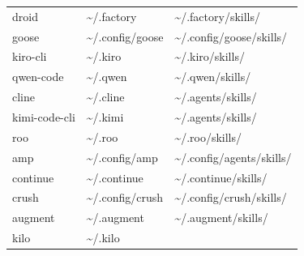 \documentclass[
  american,
  10pt,
]{report}
\renewcommand{\texttt}[1]{{\ttfamily\hyphenchar\font=-1 #1}}
\begin{document}
{\begin{longtable}[]{@{}lll@{}}
\texttt{droid} &
\texttt{\textasciitilde{}/\allowbreak{}.\allowbreak{}factory} &
\texttt{\textasciitilde{}/\allowbreak{}.\allowbreak{}factory/\allowbreak{}skills/\allowbreak{}} \\
\texttt{goose} &
\texttt{\textasciitilde{}/\allowbreak{}.\allowbreak{}config/\allowbreak{}goose}
&
\texttt{\textasciitilde{}/\allowbreak{}.\allowbreak{}config/\allowbreak{}goose/\allowbreak{}skills/\allowbreak{}} \\
\texttt{kiro-\allowbreak{}cli} &
\texttt{\textasciitilde{}/\allowbreak{}.\allowbreak{}kiro} &
\texttt{\textasciitilde{}/\allowbreak{}.\allowbreak{}kiro/\allowbreak{}skills/\allowbreak{}} \\
\texttt{qwen-\allowbreak{}code} &
\texttt{\textasciitilde{}/\allowbreak{}.\allowbreak{}qwen} &
\texttt{\textasciitilde{}/\allowbreak{}.\allowbreak{}qwen/\allowbreak{}skills/\allowbreak{}} \\
\texttt{cline} &
\texttt{\textasciitilde{}/\allowbreak{}.\allowbreak{}cline} &
\texttt{\textasciitilde{}/\allowbreak{}.\allowbreak{}agents/\allowbreak{}skills/\allowbreak{}} \\
\texttt{kimi-\allowbreak{}code-\allowbreak{}cli} &
\texttt{\textasciitilde{}/\allowbreak{}.\allowbreak{}kimi} &
\texttt{\textasciitilde{}/\allowbreak{}.\allowbreak{}agents/\allowbreak{}skills/\allowbreak{}} \\
\texttt{roo} & \texttt{\textasciitilde{}/\allowbreak{}.\allowbreak{}roo}
&
\texttt{\textasciitilde{}/\allowbreak{}.\allowbreak{}roo/\allowbreak{}skills/\allowbreak{}} \\
\texttt{amp} &
\texttt{\textasciitilde{}/\allowbreak{}.\allowbreak{}config/\allowbreak{}amp}
&
\texttt{\textasciitilde{}/\allowbreak{}.\allowbreak{}config/\allowbreak{}agents/\allowbreak{}skills/\allowbreak{}} \\
\texttt{continue} &
\texttt{\textasciitilde{}/\allowbreak{}.\allowbreak{}continue} &
\texttt{\textasciitilde{}/\allowbreak{}.\allowbreak{}continue/\allowbreak{}skills/\allowbreak{}} \\
\texttt{crush} &
\texttt{\textasciitilde{}/\allowbreak{}.\allowbreak{}config/\allowbreak{}crush}
&
\texttt{\textasciitilde{}/\allowbreak{}.\allowbreak{}config/\allowbreak{}crush/\allowbreak{}skills/\allowbreak{}} \\
\texttt{augment} &
\texttt{\textasciitilde{}/\allowbreak{}.\allowbreak{}augment} &
\texttt{\textasciitilde{}/\allowbreak{}.\allowbreak{}augment/\allowbreak{}skills/\allowbreak{}} \\
\texttt{kilo} &
\texttt{\textasciitilde{}/\allowbreak{}.\allowbreak{}kilo} &

\end{longtable}}
\end{document}
